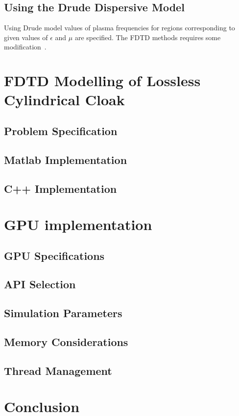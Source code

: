 \documentclass[10pt,A4paper]{report}
\begin{document}
\section{Using the Drude Dispersive Model}
Using Drude model values of plasma frequencies for regions corresponding to given values of $\epsilon$ and $\mu$ are specified. The FDTD methods requires some modification~\cite{Radial-Zhao}.

\chapter{FDTD Modelling of Lossless Cylindrical Cloak}
\section{Problem Specification}
\section{Matlab Implementation}
\section{C++ Implementation}

\chapter{GPU implementation}
\section{GPU Specifications}
\section{API Selection}
\section{Simulation Parameters}
\section{Memory Considerations}
\section{Thread Management}

\chapter{Conclusion}

\nocite{*}


\appendix

\end{document}
